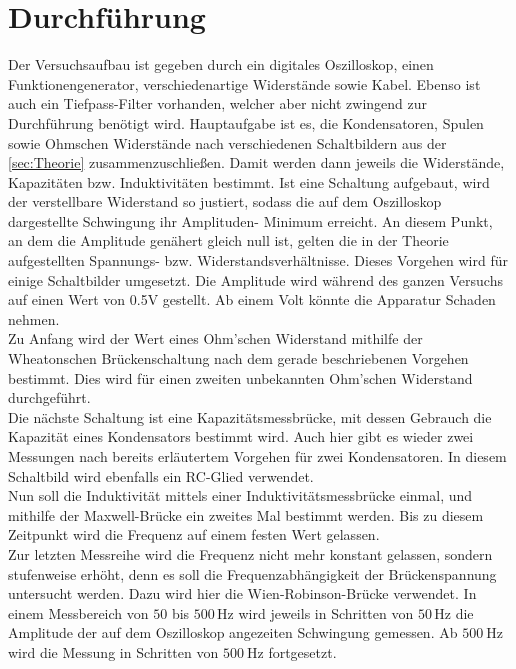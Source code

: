 \section{Durchführung}
\label{sec:Durchführung}
Der Versuchsaufbau ist gegeben durch ein digitales Oszilloskop, einen Funktionengenerator, verschiedenartige 
Widerstände sowie Kabel. Ebenso ist auch ein Tiefpass-Filter vorhanden, welcher aber nicht zwingend zur
Durchführung benötigt wird. Hauptaufgabe ist es, die Kondensatoren, Spulen sowie Ohmschen Widerstände
nach verschiedenen Schaltbildern aus der \ref{sec:Theorie} zusammenzuschließen. Damit werden dann jeweils die
Widerstände, Kapazitäten bzw. Induktivitäten bestimmt. Ist eine Schaltung aufgebaut, wird 
der verstellbare Widerstand so justiert, sodass die auf dem Oszilloskop dargestellte Schwingung ihr Amplituden-
Minimum erreicht. An diesem Punkt, an dem die Amplitude genähert gleich null ist, gelten 
die in der Theorie aufgestellten Spannungs- bzw. Widerstandsverhältnisse. Dieses Vorgehen wird
für einige Schaltbilder umgesetzt. Die Amplitude wird während des ganzen Versuchs auf einen Wert von 0.5V gestellt.
Ab einem Volt könnte die Apparatur Schaden nehmen. \\ \noindent 
Zu Anfang wird der Wert eines Ohm'schen Widerstand mithilfe der 
Wheatonschen Brückenschaltung nach dem  gerade beschriebenen Vorgehen bestimmt. Dies wird für einen
zweiten unbekannten Ohm'schen Widerstand durchgeführt.\\

Die nächste Schaltung ist eine Kapazitätsmessbrücke, mit dessen Gebrauch die Kapazität eines Kondensators
bestimmt wird. Auch hier gibt es wieder zwei Messungen nach bereits erläutertem Vorgehen für zwei Kondensatoren.
In diesem Schaltbild wird ebenfalls ein RC-Glied verwendet.
\\
Nun soll die Induktivität mittels einer Induktivitätsmessbrücke einmal, und mithilfe der Maxwell-Brücke ein zweites Mal 
bestimmt werden. Bis zu diesem Zeitpunkt wird die Frequenz auf einem festen Wert gelassen. 
\\
Zur letzten Messreihe wird die Frequenz nicht mehr konstant gelassen, sondern stufenweise erhöht, denn es soll die 
Frequenzabhängigkeit der Brückenspannung untersucht werden. Dazu wird hier die Wien-Robinson-Brücke 
verwendet. In einem Messbereich von $50$ bis $500$\,Hz wird jeweils in Schritten von $50$\,Hz die Amplitude der 
auf dem Oszilloskop angezeiten Schwingung gemessen. Ab $\qty{500}{\hertz}$ wird die Messung in Schritten von 
$\qty{500}{\hertz}$ fortgesetzt. 
